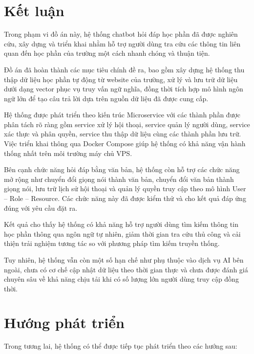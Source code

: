 \documentclass[../DoAn.tex]{subfiles}
\begin{document}
\section{Kết luận}
Trong phạm vi đồ án này, hệ thống chatbot hỏi đáp học phần đã được nghiên cứu, xây dựng và triển khai nhằm hỗ trợ người dùng tra cứu các thông tin liên quan đến học phần của trường một cách nhanh chóng và thuận tiện.

Đồ án đã hoàn thành các mục tiêu chính đề ra, bao gồm xây dựng hệ thống thu thập dữ liệu học phần tự động từ website của trường, xử lý và lưu trữ dữ liệu dưới dạng vector phục vụ truy vấn ngữ nghĩa, đồng thời tích hợp mô hình ngôn ngữ lớn để tạo câu trả lời dựa trên nguồn dữ liệu đã được cung cấp.

Hệ thống được phát triển theo kiến trúc Microservice với các thành phần được phân tách rõ ràng gồm service xử lý hội thoại, service quản lý người dùng, service xác thực và phân quyền, service thu thập dữ liệu cùng các thành phần lưu trữ. Việc triển khai thông qua Docker Compose giúp hệ thống có khả năng vận hành thống nhất trên môi trường máy chủ VPS.

Bên cạnh chức năng hỏi đáp bằng văn bản, hệ thống còn hỗ trợ các chức năng mở rộng như chuyển đổi giọng nói thành văn bản, chuyển đổi văn bản thành giọng nói, lưu trữ lịch sử hội thoại và quản lý quyền truy cập theo mô hình User -- Role -- Resource. Các chức năng này đã được kiểm thử và cho kết quả đáp ứng đúng với yêu cầu đặt ra.

Kết quả cho thấy hệ thống có khả năng hỗ trợ người dùng tìm kiếm thông tin học phần thông qua ngôn ngữ tự nhiên, giảm thời gian tra cứu thủ công và cải thiện trải nghiệm tương tác so với phương pháp tìm kiếm truyền thống.

Tuy nhiên, hệ thống vẫn còn một số hạn chế như phụ thuộc vào dịch vụ AI bên ngoài, chưa có cơ chế cập nhật dữ liệu theo thời gian thực và chưa được đánh giá chuyên sâu về khả năng chịu tải khi có số lượng lớn người dùng truy cập đồng thời.

\section{Hướng phát triển} 

Trong tương lai, hệ thống có thể được tiếp tục phát triển theo các hướng sau:
\end{document}
